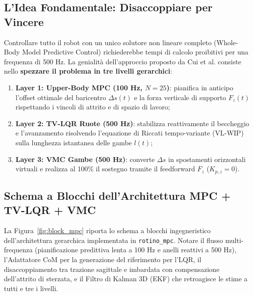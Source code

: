 \documentclass[11pt,a4paper]{article}
\begin{document}
\subsection{L'Idea Fondamentale: Disaccoppiare per Vincere}
Controllare tutto il robot con un unico solutore non lineare completo (Whole-Body Model Predictive Control) richiederebbe tempi di calcolo proibitivi per una frequenza di 500 Hz. La genialità dell'approccio proposto da Cui et al. consiste nello \textbf{spezzare il problema in tre livelli gerarchici}:
\begin{enumerate}
    \item \textbf{Layer 1: Upper-Body MPC (100 Hz, $N=25$)}: pianifica in anticipo l'offset ottimale del baricentro $\Delta s(t)$ e la forza verticale di supporto $F_z(t)$ rispettando i vincoli di attrito e di spazio di lavoro;
    \item \textbf{Layer 2: TV-LQR Ruote (500 Hz)}: stabilizza reattivamente il beccheggio e l'avanzamento risolvendo l'equazione di Riccati tempo-variante (VL-WIP) sulla lunghezza istantanea delle gambe $l(t)$;
    \item \textbf{Layer 3: VMC Gambe (500 Hz)}: converte $\Delta s$ in spostamenti orizzontali virtuali e realizza al 100\% il sostegno tramite il feedforward $F_z$ ($K_{p,z} = 0$).
\end{enumerate}

\subsection{Schema a Blocchi dell'Architettura MPC + TV-LQR + VMC}
La Figura~\ref{fig:block_mpc} riporta lo schema a blocchi ingegneristico dell'architettura gerarchica implementata in \texttt{rotino\_mpc}. Notare il flusso multi-frequenza (pianificazione predittiva lenta a 100 Hz e anelli reattivi a 500 Hz), l'Adattatore CoM per la generazione del riferimento per l'LQR, il disaccoppiamento tra trazione sagittale e imbardata con compensazione dell'attrito di sterzata, e il Filtro di Kalman 3D (EKF) che retroagisce le stime a tutti e tre i livelli.
\end{document}

